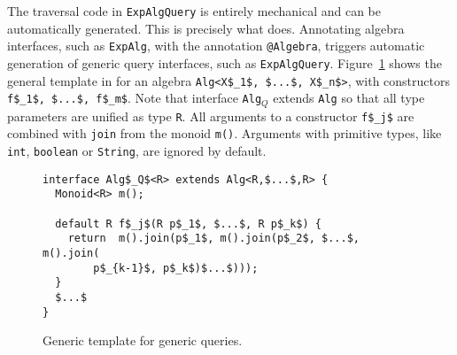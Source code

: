 
The traversal code in \lstinline{ExpAlgQuery} is entirely
mechanical and can be automatically generated.  This is precisely what
\name does. Annotating algebra interfaces, such as \lstinline{ExpAlg}, with the annotation \lstinline{@Algebra},
triggers automatic generation of generic query interfaces, such as \lstinline{ExpAlgQuery}.
Figure~\ref{queryTemplate} shows the general template in \name for an algebra \lstinline[mathescape=true]{Alg<X$_1$, $...$, X$_n$>}, with constructors \lstinline[mathescape=true]{f$_1$, $...$, f$_m$}.
Note that interface \lstinline{Alg}$_Q$ extends \lstinline{Alg} so that all type parameters are unified as type \lstinline{R}.
All arguments to a constructor \lstinline[mathescape=true]{f$_j$} are combined with \lstinline{join} from the monoid \lstinline{m()}. Arguments with primitive types, like \lstinline{int}, \lstinline{boolean} or \lstinline{String}, are ignored by default.

\begin{figure}[ht]
\nocaptionrule
\begin{lstlisting}[mathescape=true]
interface Alg$_Q$<R> extends Alg<R,$...$,R> {
  Monoid<R> m();

  default R f$_j$(R p$_1$, $...$, R p$_k$) {
    return  m().join(p$_1$, m().join(p$_2$, $...$, m().join(
        p$_{k-1}$, p$_k$)$...$)));
  }
  $...$
}
\end{lstlisting}
\caption{Generic template for generic queries.}
\label{queryTemplate}
\end{figure}

